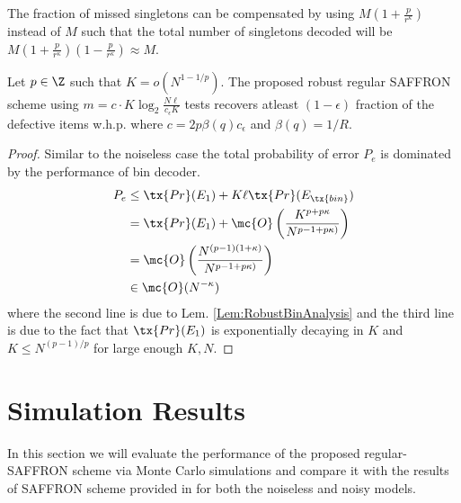 \documentclass[conference,twocolumn]{IEEEtran}
\def\ceps{c_{\epsilon}}
\begin{document}
The fraction of missed singletons can be compensated by using $M(1+\frac{p}{r^{\kappa}})$ instead of $M$ such that the total number of singletons decoded will be $M(1+\frac{p}{r^{\kappa}})(1-\frac{p}{r^{\kappa}})\approx M$.
\begin{theorem}
Let $p\in\Z$ such that $K=o\left(N^{1-1/p}\right)$. The proposed robust regular SAFFRON scheme using $m=c\cdot K \log_{2}\frac{N\ell}{\ceps K}$ tests recovers atleast $(1-\epsilon)$ fraction of the defective items w.h.p. where $c=2p\beta(q)\ceps$ and $\beta(q)=1/R$. 
%
\end{theorem}
\begin{proof}
Similar to the noiseless case the total probability of error $P_e$ is dominated by the performance of bin decoder. 
\begin{align*}
P_e &\leq  \tx{Pr}(E_1)+ K\ell\tx{ Pr}(E_{\tx{bin}})\\
               &=\tx{Pr}(E_1)+ \mc{O}\left( \frac{K^{p+p\kappa}}{N^{p-1+p\kappa)}}\right)\\
   			   &= \mc{O}\left( \frac{N^{(p-1)(1+\kappa)}}{N^{p-1+p\kappa)}}\right)\\
               &\in \mc{O}(N^{-\kappa})
\end{align*}
where the second line is due to Lem. \ref{Lem:RobustBinAnalysis} and the third line is due to the fact that $\tx{Pr}(E_1)$ is exponentially decaying in $K$ and $K\leq N^{(p-1)/p}$ for large enough $K,N$.
\end{proof}

\section{Simulation Results}
In this section we will evaluate the performance of the proposed regular-SAFFRON scheme via Monte Carlo simulations and compare it with the results of SAFFRON scheme provided in \cite{lee2015saffron} for both the noiseless and noisy models.
\end{document}
